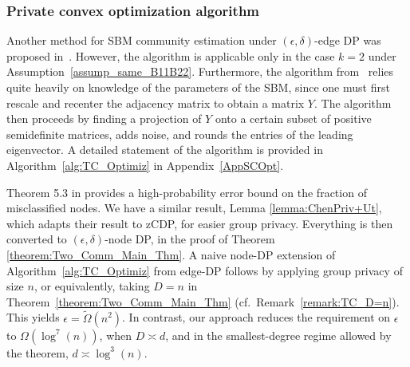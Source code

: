 \documentclass{article}
\newcommand{\eps}{\varepsilon}
\begin{document}



\subsubsection{Private convex optimization algorithm}

Another method for SBM community estimation under $(\epsilon, \delta)$-edge DP was proposed in~\cite{CheEtal23}. However, the algorithm is applicable only in the case $k=2$ under Assumption~\ref{assump_same_B11B22}. Furthermore, the algorithm from~\cite{CheEtal23} relies quite heavily on knowledge of the parameters of the SBM, since one must first rescale and recenter the adjacency matrix to obtain a matrix $Y$. The algorithm then proceeds by finding a projection of $Y$ onto a certain subset of positive semidefinite matrices, adds noise, and rounds the entries of the leading eigenvector.  A detailed statement of the algorithm is provided in Algorithm~\ref{alg:TC_Optimiz} in Appendix~\ref{AppSCOpt}.

Theorem 5.3 in \cite{CheEtal23} provides a high-probability error bound on the fraction of misclassified nodes. We have a similar result, Lemma \ref{lemma:ChenPriv+Ut}, which adapts their result to zCDP, for easier group privacy. Everything is then converted to $(\epsilon, \delta)$-node DP, in the proof of Theorem \ref{theorem:Two_Comm_Main_Thm}. A naive node-DP extension of Algorithm~\ref{alg:TC_Optimiz} from edge-DP follows by applying group privacy of size $n$, or equivalently, taking $D = n$ in Theorem~\ref{theorem:Two_Comm_Main_Thm} (cf.\ Remark~\ref{remark:TC_D=n}). This yields $\epsilon=\widetilde{\Omega}(n^2)$. In contrast, our approach reduces the requirement on $\epsilon$ to $\Omega(\log^7(n))$, when $D \asymp d$, and in the smallest-degree regime allowed by the theorem, $d\asymp \log^3(n)$.
\end{document}
